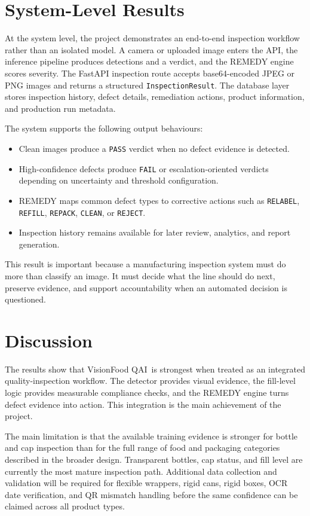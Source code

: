 \documentclass[12pt,a4paper]{report}
\newcommand{\shorttitle}{VisionFood QAI}
\begin{document}
\section{System-Level Results}
\label{sec:system-level-results}

At the system level, the project demonstrates an end-to-end inspection workflow rather than an isolated model. A camera or uploaded image enters the API, the inference pipeline produces detections and a verdict, and the REMEDY engine scores severity. The FastAPI inspection route accepts base64-encoded JPEG or PNG images and returns a structured \texttt{InspectionResult}. The database layer stores inspection history, defect details, remediation actions, product information, and production run metadata.

The system supports the following output behaviours:
\begin{itemize}
  \item Clean images produce a \texttt{PASS} verdict when no defect evidence is detected.
  \item High-confidence defects produce \texttt{FAIL} or escalation-oriented verdicts depending on uncertainty and threshold configuration.
  \item REMEDY maps common defect types to corrective actions such as \texttt{RELABEL}, \texttt{REFILL}, \texttt{REPACK}, \texttt{CLEAN}, or \texttt{REJECT}.
  \item Inspection history remains available for later review, analytics, and report generation.
\end{itemize}

This result is important because a manufacturing inspection system must do more than classify an image. It must decide what the line should do next, preserve evidence, and support accountability when an automated decision is questioned.

\section{Discussion}
\label{sec:results-discussion-section}

The results show that \shorttitle\ is strongest when treated as an integrated quality-inspection workflow. The detector provides visual evidence, the fill-level logic provides measurable compliance checks, and the REMEDY engine turns defect evidence into action. This integration is the main achievement of the project.

The main limitation is that the available training evidence is stronger for bottle and cap inspection than for the full range of food and packaging categories described in the broader design. Transparent bottles, cap status, and fill level are currently the most mature inspection path. Additional data collection and validation will be required for flexible wrappers, rigid cans, rigid boxes, OCR date verification, and QR mismatch handling before the same confidence can be claimed across all product types.
\end{document}
